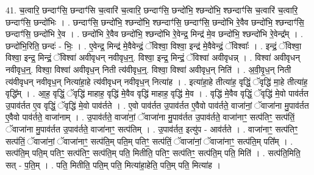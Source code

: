 \documentclass[17pt]{extarticle}
\begin{document}
41. च॒त्वारि॒ छन्दाꣳ॑सि॒ छन्दाꣳ॑सि च॒त्वारि॑ च॒त्वारि॒ छन्दाꣳ॑सि॒ छन्दो॑भि॒ श्छन्दो॑भि॒ श्छन्दाꣳ॑सि च॒त्वारि॑ च॒त्वारि॒ छन्दाꣳ॑सि॒ छन्दो॑भिः । . छन्दाꣳ॑सि॒ छन्दो॑भि॒ श्छन्दो॑भि॒ श्छन्दाꣳ॑सि॒ छन्दाꣳ॑सि॒ छन्दो॑भि रे॒वैव छन्दो॑भि॒ श्छन्दाꣳ॑सि॒ छन्दाꣳ॑सि॒ छन्दो॑भि रे॒व । . छन्दो॑भि रे॒वैव छन्दो॑भि॒ श्छन्दो॑भि रे॒वेन्द्र॒ मिन्द्र॑ मे॒व छन्दो॑भि॒ श्छन्दो॑भि रे॒वेन्द्र᳚म् । . छन्दो॑भि॒रिति॒ छन्दः॑ - भिः॒ । . ए॒वेन्द्र॒ मिन्द्र॑ मे॒वैवेन्द्रं॒ ॅविश्वा॒ विश्वा॒ इन्द्र॑ मे॒वैवेन्द्रं॒ ॅविश्वाः᳚ । . इन्द्रं॒ ॅविश्वा॒ विश्वा॒ इन्द्र॒ मिन्द्रं॒ ॅविश्वा॑ अवीवृधन् नवीवृध॒न्॒. विश्वा॒ इन्द्र॒ मिन्द्रं॒ ॅविश्वा॑ अवीवृधन्न् । . विश्वा॑ अवीवृधन् नवीवृध॒न्॒. विश्वा॒ विश्वा॑ अवीवृध॒न् निती त्य॑वीवृध॒न्॒. विश्वा॒ विश्वा॑ अवीवृध॒न् निति॑ । . अ॒वी॒वृ॒ध॒न् निती त्य॑वीवृधन् नवीवृध॒न् नित्या॑हा॒हे त्य॑वीवृधन् नवीवृध॒न् नित्या॑ह । . इत्या॑हा॒हे तीत्या॑ह॒ वृद्धिं॒ ॅवृद्धि॑ मा॒हे तीत्या॑ह॒ वृद्धि᳚म् । . आ॒ह॒ वृद्धिं॒ ॅवृद्धि॑ माहाह॒ वृद्धि॑ मे॒वैव वृद्धि॑ माहाह॒ वृद्धि॑ मे॒व । . वृद्धि॑ मे॒वैव वृद्धिं॒ ॅवृद्धि॑ मे॒वो पाव॑र्तत उ॒पाव॑र्तत ए॒व वृद्धिं॒ ॅवृद्धि॑ मे॒वो पाव॑र्तते । . ए॒वो पाव॑र्तत उ॒पाव॑र्तत ए॒वैवो पाव॑र्तते॒ वाजा॑नां॒ ॅवाजा॑ना मु॒पाव॑र्तत ए॒वैवो पाव॑र्तते॒ वाजा॑नाम् । . उ॒पाव॑र्तते॒ वाजा॑नां॒ ॅवाजा॑ना मु॒पाव॑र्तत उ॒पाव॑र्तते॒ वाजा॑नाꣳ॒॒ सत्प॑तिꣳ॒॒ सत्प॑तिं॒ ॅवाजा॑ना मु॒पाव॑र्तत उ॒पाव॑र्तते॒ वाजा॑नाꣳ॒॒ सत्प॑तिम् । . उ॒पाव॑र्तत॒ इत्यु॑प - आव॑र्तते । . वाजा॑नाꣳ॒॒ सत्प॑तिꣳ॒॒ सत्प॑तिं॒ ॅवाजा॑नां॒ ॅवाजा॑नाꣳ॒॒ सत्प॑ति॒म् पति॒म् पतिꣳ॒॒ सत्प॑तिं॒ ॅवाजा॑नां॒ ॅवाजा॑नाꣳ॒॒ सत्प॑ति॒म् पति᳚म् । . सत्प॑ति॒म् पति॒म् पतिꣳ॒॒ सत्प॑तिꣳ॒॒ सत्प॑ति॒म् पति॒ मितीति॒ पतिꣳ॒॒ सत्प॑तिꣳ॒॒ सत्प॑ति॒म् पति॒ मिति॑ । . सत्प॑ति॒मिति॒ सत् - प॒ति॒म् । . पति॒ मितीति॒ पति॒म् पति॒ मित्या॑हा॒हेति॒ पति॒म् पति॒ मित्या॑ह । \newline
\pagebreak
{}
\end{document}
